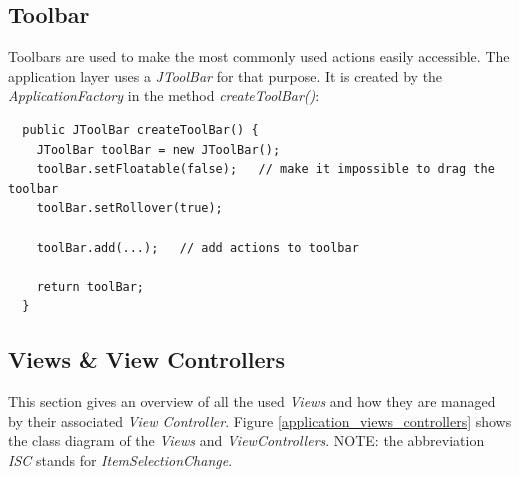 \subsection{Toolbar}
Toolbars are used to make the most commonly used actions easily accessible. The application layer uses a \textit{JToolBar} for that purpose. It is created by the \textit{ApplicationFactory} in the method \textit{createToolBar()}:

\begin{verbatim}
  public JToolBar createToolBar() {
    JToolBar toolBar = new JToolBar();
    toolBar.setFloatable(false);   // make it impossible to drag the toolbar
    toolBar.setRollover(true);

    toolBar.add(...);   // add actions to toolbar

    return toolBar;
  }
\end{verbatim}

\subsection{Views \& View Controllers}
This section gives an overview of all the used \textit{Views} and how they are managed by their associated \textit{View Controller}. Figure \ref{application_views_controllers} shows the class diagram of the \textit{Views} and \textit{ViewControllers}. NOTE: the abbreviation \textit{ISC} stands for \textit{ItemSelectionChange}.

